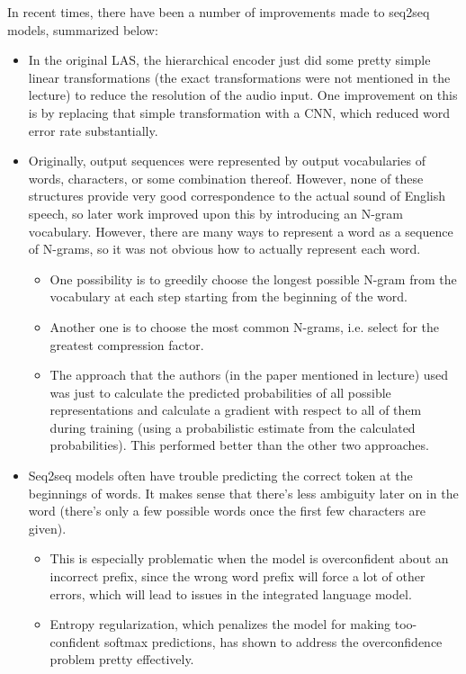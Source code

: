 In recent times, there have been a number of improvements made to seq2seq models, summarized below:
\begin{itemize}
\item In the original LAS, the hierarchical encoder just did some pretty simple linear transformations (the exact transformations were not mentioned in the lecture) to reduce the resolution of the audio input. One improvement on this is by replacing that simple transformation with a CNN, which reduced word error rate substantially.
\item Originally, output sequences were represented by output vocabularies of words, characters, or some combination thereof. However, none of these structures provide very good correspondence to the actual sound of English speech, so later work improved upon this by introducing an N-gram vocabulary. However, there are many ways to represent a word as a sequence of N-grams, so it was not obvious how to actually represent each word.
\begin{itemize}
\item One possibility is to greedily choose the longest possible N-gram from the vocabulary at each step starting from the beginning of the word.
\item Another one is to choose the most common N-grams, i.e. select for the greatest compression factor.
\item The approach that the authors (in the paper mentioned in lecture) used was just to calculate the predicted probabilities of all possible representations and calculate a gradient with respect to all of them during training (using a probabilistic estimate from the calculated probabilities). This performed better than the other two approaches.
\end{itemize}
\item Seq2seq models often have trouble predicting the correct token at the beginnings of words. It makes sense that there's less ambiguity later on in the word (there's only a few possible words once the first few characters are given).
\begin{itemize}
\item This is especially problematic when the model is overconfident about an incorrect prefix, since the wrong word prefix will force a lot of other errors, which will lead to issues in the integrated language model.
\item Entropy regularization, which penalizes the model for making too-confident softmax predictions, has shown to address the overconfidence problem pretty effectively.

\end{itemize}
\end{itemize}
